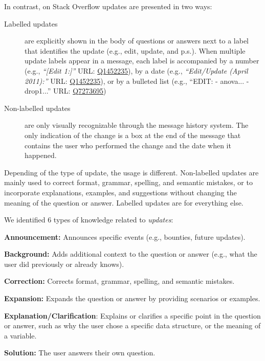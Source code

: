 \documentclass{sig-alternate-05-2015}
\begin{document}
	In contrast, on Stack Overflow updates are presented in two ways:
	\begin{description}
		\item[Labelled updates] are explicitly shown in the body of questions or answers next to a label that identifies the update (e.g., edit, update, and p.s.).
		When multiple update labels appear in a message, each label is accompanied by a number (e.g., \textit{``[Edit 1:]''} {\footnotesize URL:  \href{http://goo.gl/ptYAG0}{Q1452235}}), by a date (e.g., \textit{``Edit/Update (April 2011):''} {\footnotesize URL:  \href{http://goo.gl/ptYAG0}{Q1452235}}), or by a bulleted list (e.g., ``EDIT: - anova... -drop1...'' {\footnotesize URL:  \href{http://goo.gl/sQiq0M}{Q7273695}})

		\item[Non-labelled updates] are only visually recognizable through the message history system. The only indication of the change is a box at the end of the message that contains the user who performed the change and the date when it happened.
	\end{description}

	Depending of the type of update, the usage is different.
	Non-labelled updates are mainly used to correct format, grammar, spelling, and semantic mistakes, or to incorporate explanations, examples, and suggestions without changing the meaning of the question or answer. Labelled updates are for everything else.

	We identified 6 types of knowledge related to \textit{updates}:
	\begin{packed_enum}
		\item \textbf{Announcement:} Announces specific events (e.g., bounties, future updates).
		\item \textbf{Background:} Adds additional context to the question or answer (e.g., what the user did previously or already knows).
		\item \textbf{Correction:} Corrects format, grammar, spelling, and semantic mistakes.
		\item \textbf{Expansion:} Expands the question or answer by providing scenarios or examples.
		\item \textbf{Explanation/Clarification}: Explains or clarifies a specific point in the question or answer, such as why the user chose a specific data structure, or the meaning of a variable.
		\item \textbf{Solution:} The user answers their own question.
	\end{packed_enum}
\end{document}
